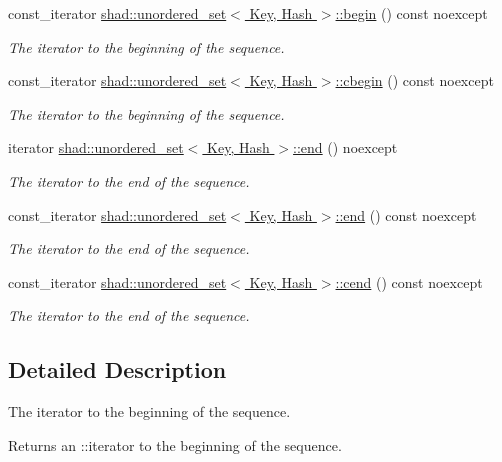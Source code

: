 \begin{DoxyCompactItemize}
\item 
const\-\_\-iterator \hyperlink{group__Iterators_ga7b0cf402ea13363d91f41500398bc169}{shad\-::unordered\-\_\-set$<$ Key, Hash $>$\-::begin} () const noexcept
\begin{DoxyCompactList}\small\item\em The iterator to the beginning of the sequence. \end{DoxyCompactList}\item 
const\-\_\-iterator \hyperlink{group__Iterators_ga1b4c22820f74a086408bba4473e75fc8}{shad\-::unordered\-\_\-set$<$ Key, Hash $>$\-::cbegin} () const noexcept
\begin{DoxyCompactList}\small\item\em The iterator to the beginning of the sequence. \end{DoxyCompactList}\item 
iterator \hyperlink{group__Iterators_ga1c2adae7ef5d88a306b0fd64dcb0d6c0}{shad\-::unordered\-\_\-set$<$ Key, Hash $>$\-::end} () noexcept
\begin{DoxyCompactList}\small\item\em The iterator to the end of the sequence. \end{DoxyCompactList}\item 
const\-\_\-iterator \hyperlink{group__Iterators_ga818d2e58976ab04e274c6e4545a91898}{shad\-::unordered\-\_\-set$<$ Key, Hash $>$\-::end} () const noexcept
\begin{DoxyCompactList}\small\item\em The iterator to the end of the sequence. \end{DoxyCompactList}\item 
const\-\_\-iterator \hyperlink{group__Iterators_ga40eee9a29ad32b5981f0986ba2d102a8}{shad\-::unordered\-\_\-set$<$ Key, Hash $>$\-::cend} () const noexcept
\begin{DoxyCompactList}\small\item\em The iterator to the end of the sequence. \end{DoxyCompactList}\end{DoxyCompactItemize}


\subsection{Detailed Description}
The iterator to the beginning of the sequence. \begin{DoxyReturn}{Returns}
an \-::iterator to the beginning of the sequence. 
\end{DoxyReturn}


